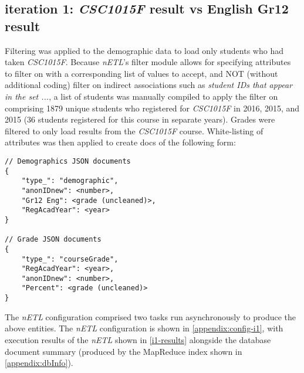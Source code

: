 \subsection{iteration 1: \textit{CSC1015F} result vs English Gr12 result}
Filtering was applied to the demographic data to load only students who had taken \textit{CSC1015F}. Because \textit{nETL}'s filter module allows for specifying attributes to filter on with a corresponding list of values to accept, and NOT (without additional coding) filter on indirect associations such as \textit{student IDs that appear in the set ...}, a list of students was manually compiled to apply the filter on comprising 1879 unique students who registered for \textit{CSC1015F} in 2016, 2015, and 2015 (36 students registered for this course in separate years). Grades were filtered to only load results from the \textit{CSC1015F} course. White-listing of attributes was then applied to create docs of the following form:

\begin{verbatim}
// Demographics JSON documents
{
    "type_": "demographic",
    "anonIDnew": <number>,
    "Gr12 Eng": <grade (uncleaned)>,
    "RegAcadYear": <year>
}

// Grade JSON documents
{
    "type_": "courseGrade",
    "RegAcadYear": <year>,
    "anonIDnew": <number>,
    "Percent": <grade (uncleaned)>
}
\end{verbatim}

The \textit{nETL} configuration comprised two tasks run asynchronously to produce the above entities. The \textit{nETL} configuration is shown in \ref{appendix:config-i1}, with execution results of the \textit{nETL} shown in \ref{i1-results} alongside the database document summary (produced by the MapReduce index shown in \ref{appendix:dbInfo}).


